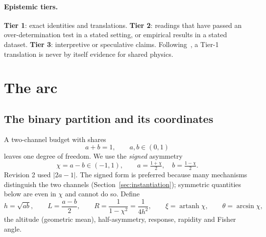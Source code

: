 \documentclass[11pt]{article}
\theoremstyle{definition}
\theoremstyle{remark}
\newcommand{\artanh}{\operatorname{artanh}}
\begin{document}
\paragraph{Epistemic tiers.} \textbf{Tier 1}: exact identities and translations.
\textbf{Tier 2}: readings that have passed an over-determination test in a stated setting,
or empirical results in a stated dataset. \textbf{Tier 3}: interpretive or speculative
claims. Following~\cite{DeJesus2026CG}, a Tier-1 translation is never by itself evidence
for shared physics.

\begin{center}
\end{center}

\section{The arc}\label{sec:arc}

\subsection{The binary partition and its coordinates}
A two-channel budget with shares
\begin{equation}\label{eq:partition}
a+b=1,\qquad a,b\in(0,1)
\end{equation}
leaves one degree of freedom. We use the \emph{signed} asymmetry
\begin{equation}\label{eq:chi}
\chi=a-b\in(-1,1),\qquad a=\tfrac{1+\chi}{2},\quad b=\tfrac{1-\chi}{2}.
\end{equation}
Revision 2 used $|2a-1|$. The signed form is preferred because many mechanisms distinguish
the two channels (Section~\ref{sec:instantiation}); symmetric quantities below are even in
$\chi$ and cannot do so. Define
\begin{equation}\label{eq:thales}
h=\sqrt{ab},\qquad L=\frac{a-b}{2},\qquad R=\frac{1}{1-\chi^2}=\frac{1}{4h^2},
\qquad \xi=\artanh\chi,\qquad \theta=\arcsin\chi,
\end{equation}
the altitude (geometric mean), half-asymmetry, response, rapidity and Fisher angle.
\end{document}
